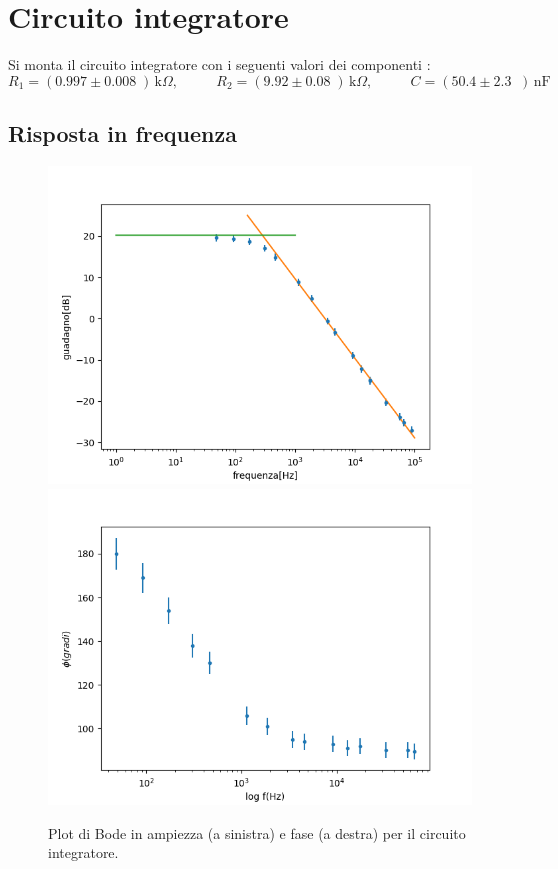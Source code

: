 \documentclass[10pt,a4paper]{article}
\newcommand{\exn}{\phantom{xxx}}
\begin{document}
\clearpage
	\section{Circuito integratore}
	Si monta il circuito integratore con i seguenti valori  dei componenti : 
	\[
	R_1 = (0.997 \pm 0.008 \;) \,\mathrm{k}\Omega, \:\:\;\:\exn 
	R_2 = (9.92 \pm 0.08 \;) \,\mathrm{k}\Omega, \:\:\;\:\exn 
	C = (50.4 \pm 2.3 \;\;)\,\mathrm{nF}
	\]
	
	\subsection{Risposta in frequenza}
	

	\begin{figure}[h]
	\begin{center}
		
		\includegraphics[scale=0.5]{bodefrequenza.png}		\includegraphics[scale=0.5]{fase.png}
		\caption{\small Plot di Bode in ampiezza (a sinistra) e fase (a destra) per il circuito integratore.}

		\label{fig:bodeinte}
	\end{center}

		
\end{figure}
\end{document}
